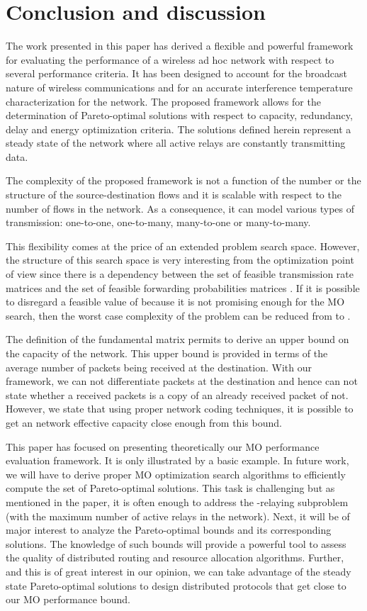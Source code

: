 \documentclass[a4paper]{article}
\begin{document}
{\section{Conclusion and discussion}\label{sec:conclusion}
The work presented in this paper has derived a flexible and powerful framework for evaluating the performance of a wireless ad hoc network with respect to several performance criteria. It has been designed to account for the broadcast nature of wireless communications and for an accurate interference temperature characterization for the network. The proposed framework allows for the determination of Pareto-optimal solutions with respect to capacity, redundancy, delay and energy optimization criteria. 
The solutions defined herein represent a steady state of the network where all active relays are constantly transmitting data. 
  
The complexity of the proposed framework is not a function of the number or the structure of the source-destination flows and it is scalable with respect to the number of flows in the network. As a consequence, it can model various types of transmission: one-to-one, one-to-many, many-to-one or many-to-many.

This flexibility comes at the price of an extended problem search space. However, the structure of this search space is very interesting from the optimization point of view since there is a dependency between the set of feasible transmission rate matrices  and the set of feasible forwarding probabilities matrices . If it is possible to disregard a feasible value of  because it is not promising enough for the MO search, then the worst case complexity of the problem can be reduced from  to  .

The definition of the fundamental matrix permits to derive an upper bound on the capacity of the network. This upper bound is provided in terms of the average number of packets being received at the destination. With our framework, we can not differentiate packets at the destination and hence can not state whether a received packets is a copy of an already received packet of not. However, we state that using proper network coding techniques, it is possible to get an network effective capacity close enough from this bound.  

This paper has focused on presenting theoretically our MO performance evaluation framework. It is only illustrated by a basic example. In future work, we will have to derive proper MO optimization search algorithms \cite{siarry} to efficiently compute the set of Pareto-optimal solutions. This task is challenging but as mentioned in the paper, it is often enough to address the -relaying subproblem (with  the maximum number of active relays in the network). Next, it will be of major interest to analyze the Pareto-optimal bounds and its corresponding solutions. The knowledge of such bounds will provide a powerful tool to assess the quality of distributed routing and resource allocation algorithms. Further, and this is of great interest in our opinion, we can take advantage of the steady state Pareto-optimal solutions to design distributed protocols that get close to our MO performance bound.       


}
\end{document}
